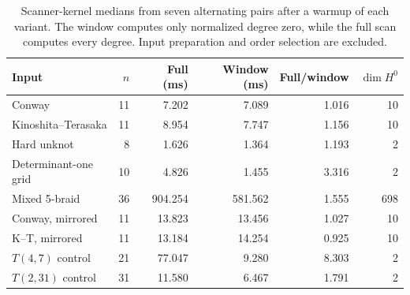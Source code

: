 \begin{table}[htbp]
\centering\small
\setlength{\tabcolsep}{4pt}
\begin{tabular}{lrrrrr}
\toprule
Input & $n$ & Full (ms) & Window (ms) & Full/window & $\dim H^0$ \\
\midrule
Conway & 11 & 7.202 & 7.089 & 1.016 & 10 \\
Kinoshita--Terasaka & 11 & 8.954 & 7.747 & 1.156 & 10 \\
Hard unknot & 8 & 1.626 & 1.364 & 1.193 & 2 \\
Determinant-one grid & 10 & 4.826 & 1.455 & 3.316 & 2 \\
Mixed 5-braid & 36 & 904.254 & 581.562 & 1.555 & 698 \\
Conway, mirrored & 11 & 13.823 & 13.456 & 1.027 & 10 \\
K--T, mirrored & 11 & 13.184 & 14.254 & 0.925 & 10 \\
$T(4,7)$ control & 21 & 77.047 & 9.280 & 8.303 & 2 \\
$T(2,31)$ control & 31 & 11.580 & 6.467 & 1.791 & 2 \\
\bottomrule
\end{tabular}
\caption{Scanner-kernel medians from seven alternating pairs after a warmup of each variant. The window computes only normalized degree zero, while the full scan computes every degree. Input preparation and order selection are excluded.}
\label{tab:window-times}
\end{table}
